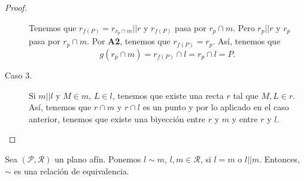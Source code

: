 \begin{proof}
\begin{description}
\[\]
Tenemos que $\displaystyle r_{f\left(P\right)} = r _{r_{p} \cap m} | | r $ y $\displaystyle r_{f\left(P\right)} $ pasa por $\displaystyle r_{p} \cap m $. Pero $\displaystyle r_{p} | | r $ y $\displaystyle r_{p} $ pasa por $\displaystyle r_{p} \cap m $. Por \textbf{A2}, tenemos que $\displaystyle r_{f\left(P\right)} = r_{p} $. Así, tenemos que
\[g\left(r_{p} \cap m\right) = r_{f\left(P\right)} \cap l = r_{p} \cap l = P .\]
\item[Caso 3.] Si $\displaystyle m | | l $ y $\displaystyle M \in m $, $\displaystyle L \in l $, tenemos que existe una recta $\displaystyle r $ tal que $\displaystyle M, L \in r $. Así, tenemos que $\displaystyle r \cap m $ y $\displaystyle r \cap l $ es un punto y por lo aplicado en el caso anterior, tenemos que existe una biyección entre $\displaystyle r $ y $\displaystyle m $ y entre $\displaystyle r $ y $\displaystyle l $.
\end{description}
\end{proof}
\begin{lema}
Sea $\displaystyle \left(\mathcal{P}, \mathcal{R}\right) $ un plano afín. Ponemos $\displaystyle l \sim m $, $\displaystyle l, m \in \mathcal{R} $, si $\displaystyle  l = m  $ o $\displaystyle l | | m $. Entonces, $\displaystyle \sim $ es una relación de equivalencia.
\end{lema}
